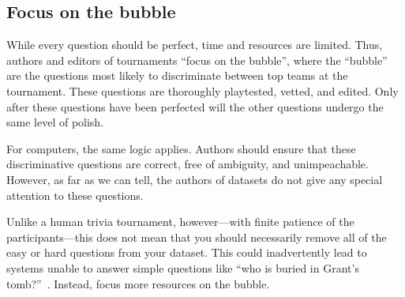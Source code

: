 \subsection{Focus on the bubble}

While every question should be perfect, time and resources are limited.  
Thus, authors and editors of tournaments ``focus on the bubble'', where the ``bubble'' are the questions most likely to discriminate between top teams at the tournament.
These questions are thoroughly playtested, vetted, and edited.
Only after these questions have been perfected will the other questions undergo the same level of polish.

For computers, the same logic applies.  
Authors should ensure that these discriminative questions are correct, free of ambiguity, and unimpeachable.
However, as far as we can tell, the authors of \qa{} datasets do not give any special attention to these questions.

Unlike a human trivia tournament, however---with finite patience of the participants---this does not mean that you should necessarily remove all of the easy or hard questions from your dataset.
This could inadvertently lead to systems unable to answer simple questions like ``who is buried in Grant's tomb?''~\cite[Chapter 7]{dwan-00}.
Instead, focus more resources on the bubble.

